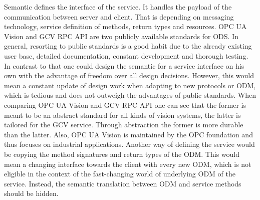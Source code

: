 \begin{table}[h]
\begin{center}
\begin{minipage}{\textwidth}
      \end{minipage}
    \end{center}
\end{table}%


Semantic defines the interface of the service. It handles the payload of the communication between server and client. That is depending on messaging technology, service definition of methods, return types and resources. OPC UA Vision \cite{VDMA2018OPCSpecification} and GCV RPC API \cite{Lastvisited2018-11-272018CloudGRPC} are two publicly available standards for ODS. In general, resorting to public standards is a good habit due to the already existing user base, detailed documentation, constant development and thorough testing. In contrast to that one could design the semantic for a service interface on his own with the advantage of freedom over all design decisions. However, this would mean a constant update of design work when adapting to new protocols or ODM, which is tedious and does not outweigh the advantages of public standards. When comparing OPC UA Vision and GCV RPC API one can see that the former is meant to be an abstract standard for all kinds of vision systems, the latter is tailored for the GCV service. Through abstraction the former is more durable than the latter. Also, OPC UA Vision is maintained by the OPC foundation and thus focuses on industrial applications. Another way of defining the service would be copying the method signatures and return types of the ODM. This would mean a changing interface towards the client with every new ODM, which is not eligible in the context of the fast-changing world of underlying ODM of the service. Instead, the semantic translation between ODM and service methods should be hidden. 


